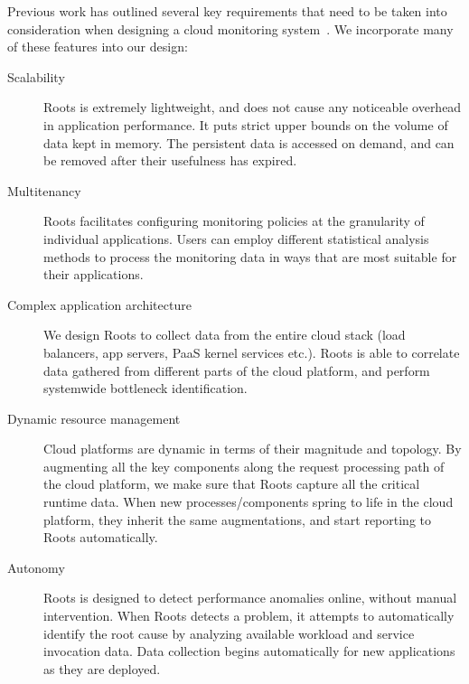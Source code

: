 Previous work has outlined several key requirements that need to be taken into consideration when
designing a cloud monitoring system~\cite{DaCunhaRodrigues:2016:MCC:2851613.2851619,Ibidunmoye:2015:PAD:2808687.2791120}. 
We incorporate many of these features into our design:
\begin{description}
\item[Scalability] Roots is extremely lightweight, and does not cause any noticeable overhead in 
application performance. It puts strict upper bounds on the volume of data kept in memory. 
The persistent data is accessed on demand, and can be removed after their usefulness has expired.
\item[Multitenancy] Roots facilitates configuring monitoring policies at the granularity of individual applications.
Users can employ different statistical analysis methods to process the monitoring data in ways that are 
most suitable for their applications.
\item[Complex application architecture] We design Roots to collect data from the entire cloud stack 
(load balancers, app servers, PaaS kernel services etc.). Roots is able to correlate data gathered
from different parts of the cloud platform, and perform systemwide bottleneck identification.
\item[Dynamic resource management] Cloud platforms are dynamic in terms of their magnitude 
and topology. By augmenting all the key components along the request processing path of the cloud platform,
we make sure that Roots capture all the critical runtime data. When new processes/components
spring to life in the cloud platform, they inherit the same augmentations, and start reporting to Roots automatically.
\item[Autonomy] Roots is designed to detect performance anomalies online, without manual intervention.
When Roots detects a problem, it attempts to automatically identify the root cause by analyzing
available workload and service invocation data. Data collection begins automatically for new
applications as they are deployed.
\end{description}

